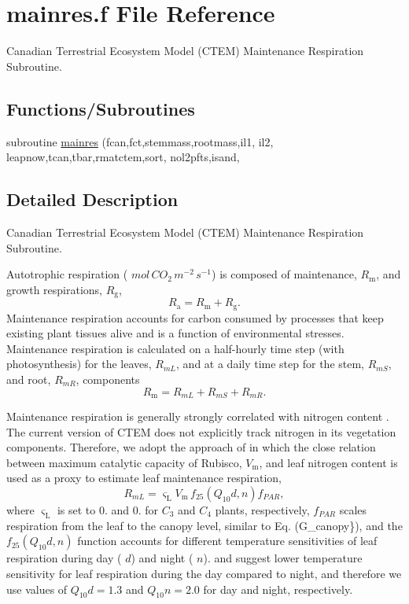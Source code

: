 \hypertarget{mainres_8f}{}\section{mainres.\+f File Reference}
\label{mainres_8f}


Canadian Terrestrial Ecosystem Model (C\+T\+E\+M) Maintenance Respiration Subroutine.  


\subsection*{Functions/\+Subroutines}
\begin{DoxyCompactItemize}
\item 
subroutine \hyperlink{mainres_8f_a86c41356a868e2ef9d08ffb14f45aff5}{mainres} (fcan,fct,stemmass,rootmass,il1, il2, leapnow,tcan,tbar,rmatctem,sort, nol2pfts,isand,
\end{DoxyCompactItemize}


\subsection{Detailed Description}
Canadian Terrestrial Ecosystem Model (C\+T\+E\+M) Maintenance Respiration Subroutine. 

Autotrophic respiration ( $mol\,CO_2\,m^{-2}\,s^{-1}$) is composed of maintenance, $R_\mathrm{m}$, and growth respirations, $R_\mathrm{g}$, \[ R_\mathrm{a} =R_\mathrm{m} + R_\mathrm{g}. \] Maintenance respiration accounts for carbon consumed by processes that keep existing plant tissues alive and is a function of environmental stresses. Maintenance respiration is calculated on a half-\/hourly time step (with photosynthesis) for the leaves, $R_{mL}$, and at a daily time step for the stem, $R_{mS}$, and root, $R_{mR}$, components \[ \label{mainres_all} R_\mathrm{m} = R_{mL} + R_{mS} + R_{mR}. \]

Maintenance respiration is generally strongly correlated with nitrogen content \cite{Reich1998-zr} \cite{Ryan1991-ai}. The current version of C\+T\+E\+M does not explicitly track nitrogen in its vegetation components. Therefore, we adopt the approach of \cite{Collatz1991-5bc} \cite{Collatz1992-jf} in which the close relation between maximum catalytic capacity of Rubisco, $V_\mathrm{m}$, and leaf nitrogen content is used as a proxy to estimate leaf maintenance respiration, \[ R_{mL} = \varsigma_\mathrm{L}V_\mathrm{m}\,f_{25}(Q_10d,n)f_{PAR}, \] where $\varsigma_\mathrm{L}$ is set to 0. and 0. for $C_3$ and $C_4$ plants, respectively, $f_{PAR}$ scales respiration from the leaf to the canopy level, similar to Eq. (G\+\_\+canopy\}), and the $f_{25}(Q_10d,n)$ function accounts for different temperature sensitivities of leaf respiration during day ( $d$) and night ( $n$). \cite{Pons2003-f26} and \cite{Xu2003-d75} suggest lower temperature sensitivity for leaf respiration during the day compared to night, and therefore we use values of $Q_10d=1.3$ and $Q_10n=2.0$ for day and night, respectively.

